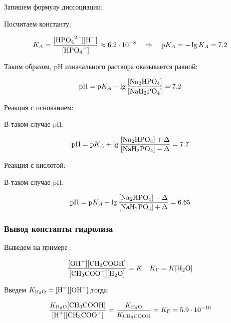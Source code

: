 \documentclass[a4paper, 12pt]{article}
\newcommand{\qrq}
{\ensuremath{\quad \Rightarrow \quad}} %
\begin{document}
Запишем формулу диссоциации:


Посчитаем константу:

\begin{equation*}
	K_A = \frac{[\ce{HPO4^2-}][\ce{H+}]}{[\ce{HPO4^-}]} \approx 6.2\cdot10^{-8} \qrq \text{p}K_A = -\lg K_A = 7.2
\end{equation*}

Таким образом, pH изначального раствора оказывается равной:

\begin{equation*}
	\text{pH} = \text{p}K_A + \lg \frac{[\ce{Na2HPO4}]}{[\ce{NaH2PO4}]} = 7.2
\end{equation*}

Реакция с основанием:


В таком случае pH:

\begin{equation*}
	\text{pH} = \text{p}K_A + \lg \frac{[\ce{Na2HPO4}] + \Delta }{[\ce{NaH2PO4}] - \Delta} = 7.7
\end{equation*}

Реакция с кислотой:


В таком случае pH:

\begin{equation*}
	\text{pH} = \text{p}K_A + \lg \frac{[\ce{Na2HPO4}] - \Delta }{[\ce{NaH2PO4}] + \Delta} = 6.65
\end{equation*}

\subsubsection*{Вывод константы гидролиза}

Выведем на примере :



\begin{equation*}
	\frac{[\ce{OH-}][\ce{CH3COOH}]}{[\ce{CH3COO-}][\ce{H2O}]} = K \quad K_\Gamma = K[\ce{H2O}] 
\end{equation*}

Введем $K_{\ce{H2O}} = [\ce{H+}][\ce{OH-}]$,тогда:

\begin{equation*}
	\frac{K_{\ce{H2O}}[\ce{CH3COOH}]}{[\ce{H+}][\ce{CH3COO-}]} = \frac{K_{\ce{H2O}}}{K_{\ce{CH3COOH}}} = K_\Gamma = 5.9 \cdot 10^{-10}
\end{equation*}
\end{document}
